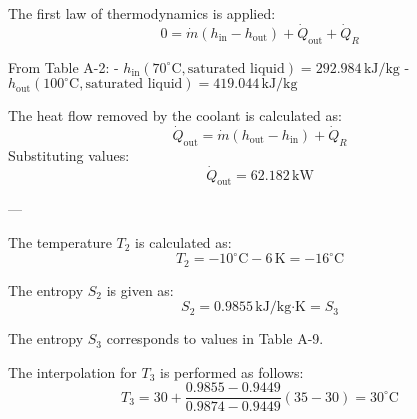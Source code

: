 The first law of thermodynamics is applied:  
\[
0 = \dot{m}(h_{\text{in}} - h_{\text{out}}) + \dot{Q}_{\text{out}} + \dot{Q}_R
\]  

From Table A-2:  
- \( h_{\text{in}}(70^\circ\text{C}, \text{saturated liquid}) = 292.984 \, \text{kJ/kg} \)  
- \( h_{\text{out}}(100^\circ\text{C}, \text{saturated liquid}) = 419.044 \, \text{kJ/kg} \)  

The heat flow removed by the coolant is calculated as:  
\[
\dot{Q}_{\text{out}} = \dot{m}(h_{\text{out}} - h_{\text{in}}) + \dot{Q}_R
\]  
Substituting values:  
\[
\dot{Q}_{\text{out}} = 62.182 \, \text{kW}
\]  

---

The temperature \( T_2 \) is calculated as:  
\[
T_2 = -10^\circ\text{C} - 6 \, \text{K} = -16^\circ\text{C}
\]

The entropy \( S_2 \) is given as:  
\[
S_2 = 0.9855 \, \text{kJ/kg·K} = S_3
\]

The entropy \( S_3 \) corresponds to values in Table A-9.  

The interpolation for \( T_3 \) is performed as follows:  
\[
T_3 = 30 + \frac{0.9855 - 0.9449}{0.9874 - 0.9449} (35 - 30) = 30^\circ\text{C}
\]